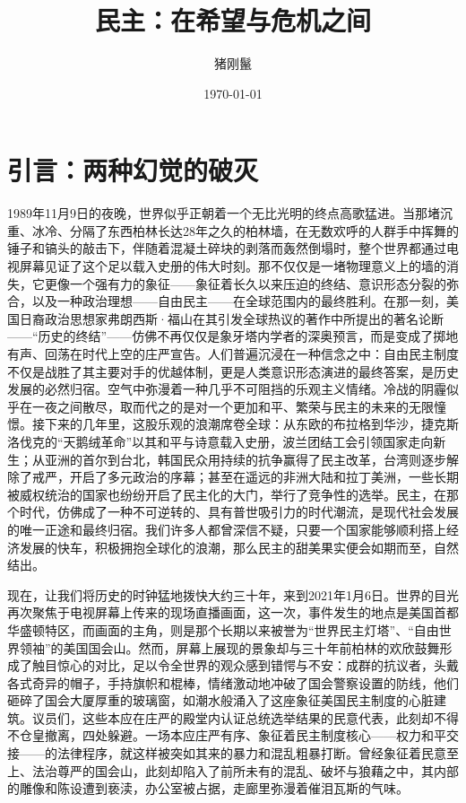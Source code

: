 \documentclass[UTF8, 10pt]{ctexbook}
\title{民主：在希望与危机之间}
\author{猪刚鬣}
\date{\today}
\begin{document}
\frontmatter

\maketitle
\tableofcontents

\mainmatter

\chapter{引言：两种幻觉的破灭}

\lettrine[lines=3]{1}{989}年11月9日的夜晚，世界似乎正朝着一个无比光明的终点高歌猛进。当那堵沉重、冰冷、分隔了东西柏林长达28年之久的柏林墙，在无数欢呼的人群手中挥舞的锤子和镐头的敲击下，伴随着混凝土碎块的剥落而轰然倒塌时，整个世界都通过电视屏幕见证了这个足以载入史册的伟大时刻。那不仅仅是一堵物理意义上的墙的消失，它更像一个强有力的象征——象征着长久以来压迫的终结、意识形态分裂的弥合，以及一种政治理想——自由民主——在全球范围内的最终胜利。在那一刻，美国日裔政治思想家弗朗西斯·福山在其引发全球热议的著作中所提出的著名论断——“历史的终结”——仿佛不再仅仅是象牙塔内学者的深奥预言，而是变成了掷地有声、回荡在时代上空的庄严宣告。人们普遍沉浸在一种信念之中：自由民主制度不仅是战胜了其主要对手的优越体制，更是人类意识形态演进的最终答案，是历史发展的必然归宿。空气中弥漫着一种几乎不可阻挡的乐观主义情绪。冷战的阴霾似乎在一夜之间散尽，取而代之的是对一个更加和平、繁荣与民主的未来的无限憧憬。接下来的几年里，这股乐观的浪潮席卷全球：从东欧的布拉格到华沙，捷克斯洛伐克的“天鹅绒革命”以其和平与诗意载入史册，波兰团结工会引领国家走向新生；从亚洲的首尔到台北，韩国民众用持续的抗争赢得了民主改革，台湾则逐步解除了戒严，开启了多元政治的序幕；甚至在遥远的非洲大陆和拉丁美洲，一些长期被威权统治的国家也纷纷开启了民主化的大门，举行了竞争性的选举。民主，在那个时代，仿佛成了一种不可逆转的、具有普世吸引力的时代潮流，是现代社会发展的唯一正途和最终归宿。我们许多人都曾深信不疑，只要一个国家能够顺利搭上经济发展的快车，积极拥抱全球化的浪潮，那么民主的甜美果实便会如期而至，自然结出。

现在，让我们将历史的时钟猛地拨快大约三十年，来到2021年1月6日。世界的目光再次聚焦于电视屏幕上传来的现场直播画面，这一次，事件发生的地点是美国首都华盛顿特区，而画面的主角，则是那个长期以来被誉为“世界民主灯塔”、“自由世界领袖”的美国国会山。然而，屏幕上展现的景象却与三十年前柏林的欢欣鼓舞形成了触目惊心的对比，足以令全世界的观众感到错愕与不安：成群的抗议者，头戴各式奇异的帽子，手持旗帜和棍棒，情绪激动地冲破了国会警察设置的防线，他们砸碎了国会大厦厚重的玻璃窗，如潮水般涌入了这座象征美国民主制度的心脏建筑。议员们，这些本应在庄严的殿堂内认证总统选举结果的民意代表，此刻却不得不仓皇撤离，四处躲避。一场本应庄严有序、象征着民主制度核心——权力和平交接——的法律程序，就这样被突如其来的暴力和混乱粗暴打断。曾经象征着民意至上、法治尊严的国会山，此刻却陷入了前所未有的混乱、破坏与狼藉之中，其内部的雕像和陈设遭到亵渎，办公室被占据，走廊里弥漫着催泪瓦斯的气味。
\end{document}
